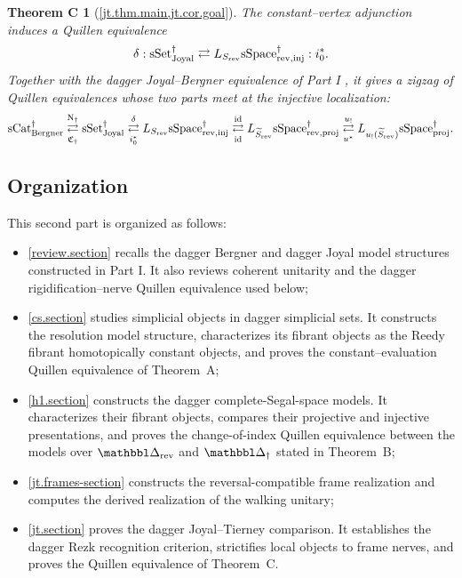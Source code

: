 \documentclass[a4paper,dvipdfmx,11pt]{amsart}
\newtheorem*{maintheoremc}{Theorem C}
\begin{document}
\begin{maintheoremc}[\cref{jt.thm.main,jt.cor.goal}]
  The constant--vertex adjunction induces a Quillen equivalence
  \begin{align}
    \delta:
    \mathrm{sSet}^{\dag}_{\mathrm{Joyal}}
    \rightleftarrows
    L_{S_{\mathrm{rev}}}\mathrm{sSpace}^{\dag}_{\mathrm{rev},\mathrm{inj}}
    :i_0^{*}.
  \end{align}
  Together with the dagger Joyal--Bergner equivalence of Part I \cite{Aka26}, it gives a zigzag of Quillen equivalences whose two parts meet at the injective localization:
  \begin{align}
    \mathrm{sCat}^{\dag}_{\mathrm{Bergner}}
    \underset{\mathfrak{C}_{\dag}}{\overset{\mathrm{N}_{\dag}}{\rightleftarrows}}
    \mathrm{sSet}^{\dag}_{\mathrm{Joyal}}
    \underset{i_0^{*}}{\overset{\delta}{\rightleftarrows}}
    L_{S_{\mathrm{rev}}}\mathrm{sSpace}^{\dag}_{\mathrm{rev},\mathrm{inj}}
    \underset{\operatorname{id}}{\overset{\operatorname{id}}{\rightleftarrows}}
    L_{\widetilde S_{\mathrm{rev}}}\mathrm{sSpace}^{\dag}_{\mathrm{rev},\mathrm{proj}}
    \underset{u^{*}}{\overset{u_{!}}{\rightleftarrows}}
    L_{u_{!}(\widetilde S_{\mathrm{rev}})}\mathrm{sSpace}^{\dag}_{\mathrm{proj}}.
  \end{align}
\end{maintheoremc}

\subsection*{Organization}

This second part is organized as follows:

\begin{itemize}
  \item \cref{review.section} recalls the dagger Bergner and dagger Joyal model structures constructed in Part I.
  It also reviews coherent unitarity and the dagger rigidification--nerve Quillen equivalence used below;
  \item \cref{cs.section} studies simplicial objects in dagger simplicial sets.
  It constructs the resolution model structure, characterizes its fibrant objects as the Reedy fibrant homotopically constant objects, and proves the constant--evaluation Quillen equivalence of Theorem~A;
  \item \cref{h1.section} constructs the dagger complete-Segal-space models.
  It characterizes their fibrant objects, compares their projective and injective presentations, and proves the change-of-index Quillen equivalence between the models over $\prism_{\rev}$ and $\prism_{\dag}$ stated in Theorem~B;
  \item \cref{jt.frames-section} constructs the reversal-compatible frame realization and computes the derived realization of the walking unitary;
  \item \cref{jt.section} proves the dagger Joyal--Tierney comparison.
  It establishes the dagger Rezk recognition criterion, strictifies local objects to frame nerves, and proves the Quillen equivalence of Theorem~C.
\end{itemize}
\end{document}
